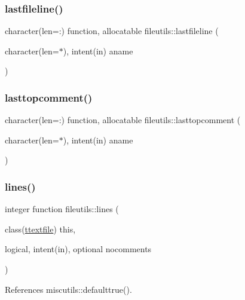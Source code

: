 \subsubsection{\texorpdfstring{lastfileline()}{lastfileline()}}
{\footnotesize\ttfamily character(len=\+:) function, allocatable fileutils\+::lastfileline (\begin{DoxyParamCaption}\item[{character(len=$\ast$), intent(in)}]{aname }\end{DoxyParamCaption})\hspace{0.3cm}{\ttfamily [private]}}

\mbox{\label{namespacefileutils_ae232e4522b4ac06686734f7d1d457d21}} 
\subsubsection{\texorpdfstring{lasttopcomment()}{lasttopcomment()}}
{\footnotesize\ttfamily character(len=\+:) function, allocatable fileutils\+::lasttopcomment (\begin{DoxyParamCaption}\item[{character(len=$\ast$), intent(in)}]{aname }\end{DoxyParamCaption})\hspace{0.3cm}{\ttfamily [private]}}

\mbox{\label{namespacefileutils_a55dce72f20c256d70de9529936f7ebd8}} 
\subsubsection{\texorpdfstring{lines()}{lines()}}
{\footnotesize\ttfamily integer function fileutils\+::lines (\begin{DoxyParamCaption}\item[{class(\mbox{\hyperlink{structfileutils_1_1ttextfile}{ttextfile}})}]{this,  }\item[{logical, intent(in), optional}]{nocomments }\end{DoxyParamCaption})\hspace{0.3cm}{\ttfamily [private]}}



References miscutils\+::defaulttrue().

